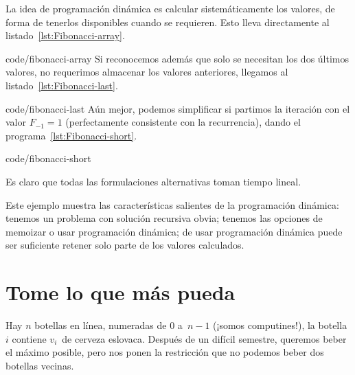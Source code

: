   La idea de programación dinámica
  es calcular sistemáticamente los valores,
  de forma de tenerlos disponibles cuando se requieren.
  Esto lleva directamente al listado~\ref{lst:Fibonacci-array}.
  
		  {code/fibonacci-array}
  Si reconocemos además que solo se necesitan los dos últimos valores,
  no requerimos almacenar los valores anteriores,
  llegamos al listado~\ref{lst:Fibonacci-last}.
  
		  {code/fibonacci-last}
  Aún mejor,
  podemos simplificar si partimos la iteración con el valor \(F_{-1} = 1\)
  (perfectamente consistente con la recurrencia),
  dando el programa~\ref{lst:Fibonacci-short}.
  
		  {code/fibonacci-short}

  Es claro que todas las formulaciones alternativas toman tiempo lineal.

  Este ejemplo muestra las características salientes
  de la programación dinámica:
  tenemos un problema con solución recursiva obvia;
  tenemos las opciones de memoizar
  o usar programación dinámica;
  de usar programación dinámica
  puede ser suficiente retener solo parte de los valores calculados.

\section{Tome lo que más pueda}
\label{sec:tomar-maximo}

  Hay \(n\) botellas en línea,
  numeradas de \num{0} a~\(n - 1\)
  (¡somos computines!),
  la botella \(i\) contiene \(v_i\)~de cerveza eslovaca.
  Después de un difícil semestre,
  queremos beber el máximo posible,
  pero nos ponen la restricción que no podemos beber dos botellas vecinas.

